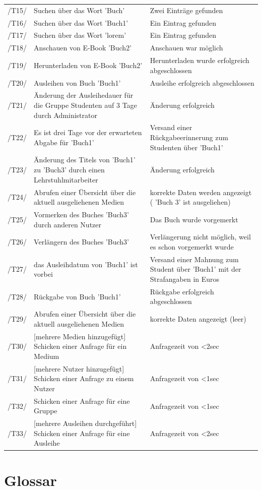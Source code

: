 \documentclass[12pt, a4paper]{article}
\begin{document}
\begin{table}
	\begin{tabular}{p{1.2cm}|p{6.5cm}|p{5.5cm}}

		\hline
		/T15/ & Suchen über das Wort  'Buch'  & Zwei Einträge gefunden\\
		/T16/ & Suchen über das Wort  'Buch1'  & Ein Eintrag gefunden\\
		\hline
		/T17/ & Suchen über das Wort  'lorem'  & Ein Eintrag gefunden\\
		\hline
		/T18/ & Anschauen von E-Book  'Buch2'  & Anschauen war möglich\\
		\hline
		/T19/ & Herunterladen von E-Book  'Buch2'  & Herunterladen wurde erfolgreich abgeschlossen\\
		\hline
		/T20/ & Ausleihen von Buch  'Buch1'  & Ausleihe erfolgreich abgeschlossen\\
		\hline
		/T21/ & Änderung der Ausleihedauer für die Gruppe Studenten auf 3 Tage durch Administrator & Änderung erfolgreich\\
		\hline
		/T22/ & Es ist drei Tage vor der erwarteten Abgabe für  'Buch1' & Versand einer Rückgabeerinnerung zum Studenten über 'Buch1' \\
		\hline
		/T23/ & Änderung des Titels von  'Buch1'  zu  'Buch3' durch einen Lehrstuhlmitarbeiter & Änderung erfolgreich\\
		\hline
		/T24/ & Abrufen einer Übersicht über die aktuell ausgeliehenen Medien & korrekte Daten werden angezeigt ( 'Buch 3'  ist ausgeliehen)\\
		\hline
		/T25/ & Vormerken des Buches 'Buch3' durch anderen Nutzer & Das Buch wurde vorgemerkt\\
		\hline
		/T26/ & Verlängern des Buches 'Buch3' & Verlängerung nicht möglich, weil es schon vorgemerkt wurde\\
		\hline
		/T27/ & das Ausleihdatum von  'Buch1'  ist vorbei & Versand einer Mahnung zum Student über  'Buch1'  mit der Strafangaben in Euros \\
		\hline
		/T28/ & Rückgabe von Buch  'Buch1'  & Rückgabe erfolgreich abgeschlossen\\
		\hline
		/T29/ & Abrufen einer Übersicht über die aktuell ausgeliehenen Medien & korrekte Daten angezeigt (leer)\\
		\hline
		/T30/ & [mehrere Medien hinzugefügt] Schicken einer Anfrage für ein Medium & Anfragezeit von \textless 2sec\\
		\hline
		/T31/ & [mehrere Nutzer hinzugefügt] Schicken einer Anfrage zu einem Nutzer & Anfragezeit von \textless 1sec\\
		\hline
		/T32/ & Schicken einer Anfrage für eine Gruppe & Anfragezeit von \textless 1sec\\
		\hline
		/T33/ & [mehrere Ausleihen durchgeführt] Schicken einer Anfrage für eine Ausleihe & Anfragezeit von \textless 2sec\\
    \end{tabular}
\end{table}
\pagebreak

\section{Glossar}
\pagebreak
\end{document}
